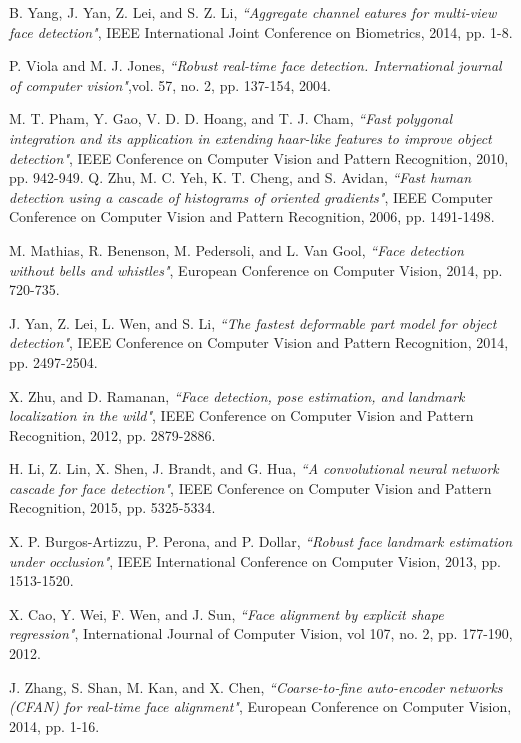 B. Yang, J. Yan, Z. Lei, and S. Z. Li,
\textit{``Aggregate channel eatures for multi-view face detection"}, IEEE International Joint Conference on Biometrics, 2014, pp. 1-8.

P. Viola and M. J. Jones,
\textit{``Robust real-time face detection. International journal of computer vision"},vol. 57, no. 2, pp. 137-154, 2004.

M. T. Pham, Y. Gao, V. D. D. Hoang, and T. J. Cham,
\textit{``Fast polygonal integration and its application in extending haar-like features to improve object detection"}, IEEE Conference on Computer Vision and Pattern Recognition, 2010, pp. 942-949.
Q. Zhu, M. C. Yeh, K. T. Cheng, and S. Avidan,
\textit{``Fast human detection using a cascade of histograms of oriented gradients"}, IEEE Computer Conference on Computer Vision and Pattern Recognition, 2006, pp. 1491-1498.

M. Mathias, R. Benenson, M. Pedersoli, and L. Van Gool,
\textit{``Face detection without bells and whistles"}, European Conference on Computer Vision,
2014, pp. 720-735.

J. Yan, Z. Lei, L. Wen, and S. Li,
\textit{``The fastest deformable part model for object detection"}, IEEE Conference on Computer Vision and Pattern Recognition, 2014, pp. 2497-2504.

X. Zhu, and D. Ramanan,
\textit{``Face detection, pose estimation, and landmark localization in the wild"}, IEEE Conference on Computer Vision and Pattern Recognition, 2012, pp. 2879-2886.

H. Li, Z. Lin, X. Shen, J. Brandt, and G. Hua,
\textit{``A convolutional neural network cascade for face detection"}, IEEE Conference on Computer Vision and Pattern Recognition, 2015, pp. 5325-5334. 

X. P. Burgos-Artizzu, P. Perona, and P. Dollar,
\textit{``Robust face landmark estimation under occlusion"}, IEEE International Conference on Computer Vision, 2013, pp. 1513-1520.

X. Cao, Y. Wei, F. Wen, and J. Sun,
\textit{``Face alignment by explicit shape regression"}, International Journal of Computer Vision, vol 107, no. 2, pp. 177-190, 2012.

J. Zhang, S. Shan, M. Kan, and X. Chen,
\textit{``Coarse-to-fine auto-encoder networks (CFAN) for real-time face alignment"}, European Conference on Computer Vision, 2014, pp. 1-16.

